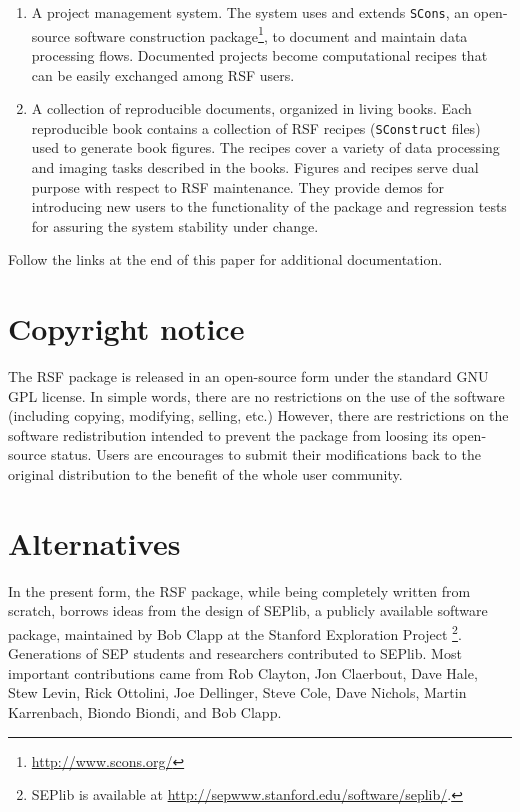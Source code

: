 \begin{enumerate}
\item A project management system. The system uses and extends \texttt{SCons},
  an open-source software construction
  package\footnote{\url{http://www.scons.org/}}, to document and maintain data
  processing flows. Documented projects become computational recipes that can
  be easily exchanged among RSF users.
  
\item A collection of reproducible documents, organized in living books. Each
  reproducible book contains a collection of RSF recipes (\texttt{SConstruct}
  files) used to generate book figures. The recipes cover a variety of data
  processing and imaging tasks described in the books. Figures and recipes
  serve dual purpose with respect to RSF maintenance. They provide demos for
  introducing new users to the functionality of the package and regression
  tests for assuring the system stability under change.

\end{enumerate}

Follow the links at the end of this paper for additional documentation.

\section{Copyright notice}

The RSF package is released in an open-source form under the standard GNU GPL
license. In simple words, there are no restrictions on the use of the software
(including copying, modifying, selling, etc.) However, there are restrictions
on the software redistribution intended to prevent the package from loosing
its open-source status. Users are encourages to submit their modifications
back to the original distribution to the benefit of the whole user community.

\section{Alternatives} 

In the present form, the RSF package, while being completely written
from scratch, borrows ideas from the design of SEPlib, a publicly
available software package, maintained by Bob Clapp at the Stanford
Exploration Project
\cite[]{Claerbout.sep.70.413,Dellinger.sep.73.461,Nichols.sep.82.257,Biondi.sep.92.343,Clapp.sep.102.bob1}\footnote{SEPlib is available at \url{http://sepwww.stanford.edu/software/seplib/}.}.
Generations of SEP students and researchers contributed to
SEPlib. Most important contributions came from Rob Clayton, Jon
Claerbout, Dave Hale, Stew Levin, Rick Ottolini, Joe Dellinger, Steve
Cole, Dave Nichols, Martin Karrenbach, Biondo Biondi, and Bob Clapp.

